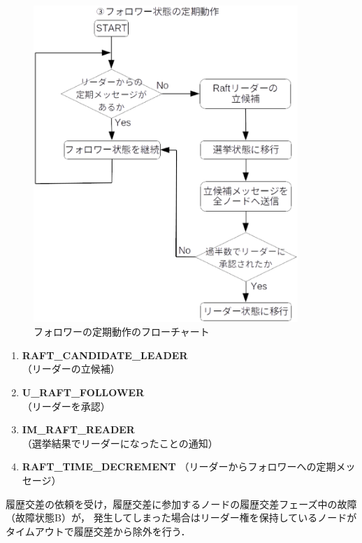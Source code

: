 \documentclass[a4paper,12pt]{jsarticle}
\begin{document}
\begin{figure}[H]%
  \begin{center}
    \includegraphics[width=100mm]{pht/raft_flow_chart-algorithm3.eps}
  \end{center}
  \caption{フォロワーの定期動作のフローチャート}
  \label{fig:Raft3}
\end{figure}


\begin{enumerate}
  \item \textbf{RAFT\_CANDIDATE\_LEADER}\\
  \hspace{12mm} （リーダーの立候補）
  \item \textbf{U\_RAFT\_FOLLOWER}\\
  \hspace{12mm} （リーダーを承認）
  \item \textbf{IM\_RAFT\_READER}\\
  \hspace{12mm} （選挙結果でリーダーになったことの通知）
  \item \textbf{RAFT\_TIME\_DECREMENT}
  \hspace{12mm} （リーダーからフォロワーへの定期メッセージ）
\end{enumerate}

履歴交差の依頼を受け，履歴交差に参加するノードの履歴交差フェーズ中の故障（故障状態B）が，
発生してしまった場合はリーダー権を保持しているノードがタイムアウトで履歴交差から除外を行う．
\end{document}
